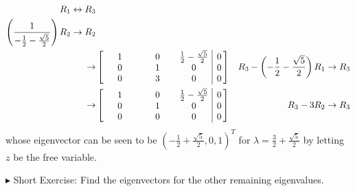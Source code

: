 \begin{solution}
\begin{align*}
\begin{aligned}
R_1 &\leftrightarrow R_3 \\
\left(\frac{1}{-\frac{1}{2}-\frac{\sqrt{5}}{2}}\right)R_2 &\to R_2
\end{aligned} \\
\to&
\left[\begin{array}{@{\,}wc{33pt}wc{30pt}wc{30pt}|c@{\,}}
1 & 0 & \frac{1}{2}-\frac{\sqrt{5}}{2} & 0 \\
0 & 1 & 0 & 0 \\
0 & 3 & 0 & 0
\end{array}\right] & R_3 - \left(-\frac{1}{2}-\frac{\sqrt{5}}{2}\right)R_1 \to R_3 \\
\to&
\left[\begin{array}{@{\,}wc{33pt}wc{30pt}wc{30pt}|c@{\,}}
1 & 0 & \frac{1}{2}-\frac{\sqrt{5}}{2} & 0 \\
0 & 1 & 0 & 0 \\
0 & 0 & 0 & 0
\end{array}\right] & R_3 - 3R_2 \to R_3
\end{align*}
whose eigenvector can be seen to be $(-\frac{1}{2}+\frac{\sqrt{5}}{2},0,1)^T$ for $\lambda = \frac{3}{2} + \frac{\sqrt{5}}{2}$ by letting $z$ be the free variable.
\end{solution}
$\blacktriangleright$ Short Exercise: Find the eigenvectors for the other remaining eigenvalues.\footnotemark

